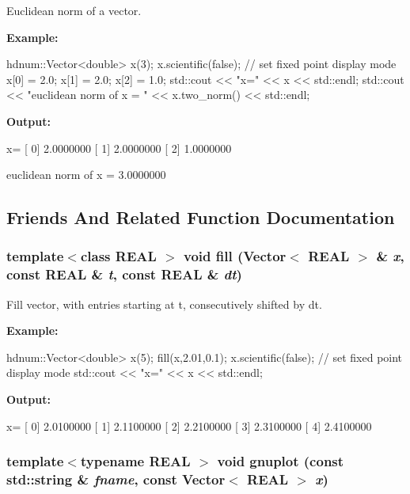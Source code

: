 Euclidean norm of a vector. 

{\bfseries Example:} 
\begin{DoxyCode}
  hdnum::Vector<double> x(3);
  x.scientific(false); // set fixed point display mode
  x[0] = 2.0;
  x[1] = 2.0;
  x[2] = 1.0;
  std::cout << "x=" << x << std::endl;
  std::cout << "euclidean norm of x = " << x.two_norm() << std::endl;
\end{DoxyCode}


{\bfseries Output:} \begin{DoxyVerb}
x=
[ 0]      2.0000000
[ 1]      2.0000000
[ 2]      1.0000000

euclidean norm of x = 3.0000000
	  \end{DoxyVerb}
 

\subsection{Friends And Related Function Documentation}
\hypertarget{classhdnum_1_1Vector_acc994daebde7d1e9699353a5672d5a92}{
\subsubsection[{fill}]{\setlength{\rightskip}{0pt plus 5cm}template$<$class REAL $>$ void fill ({\bf Vector}$<$ REAL $>$ \& {\em x}, \/  const REAL \& {\em t}, \/  const REAL \& {\em dt})}}
\label{classhdnum_1_1Vector_acc994daebde7d1e9699353a5672d5a92}


Fill vector, with entries starting at t, consecutively shifted by dt. 

{\bfseries Example:} 
\begin{DoxyCode}
  hdnum::Vector<double> x(5);
  fill(x,2.01,0.1);
  x.scientific(false); // set fixed point display mode
  std::cout << "x=" << x << std::endl;
\end{DoxyCode}


{\bfseries Output:} \begin{DoxyVerb}
x=
[ 0]      2.0100000
[ 1]      2.1100000
[ 2]      2.2100000
[ 3]      2.3100000
[ 4]      2.4100000
	  \end{DoxyVerb}
 \hypertarget{classhdnum_1_1Vector_aa4e036b4657b6e29d60f6f6c6638f403}{
\subsubsection[{gnuplot}]{\setlength{\rightskip}{0pt plus 5cm}template$<$typename REAL $>$ void gnuplot (const std::string \& {\em fname}, \/  const {\bf Vector}$<$ REAL $>$ {\em x})}}
\label{classhdnum_1_1Vector_aa4e036b4657b6e29d60f6f6c6638f403}


